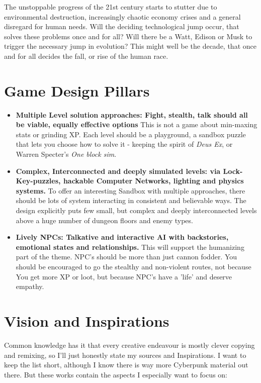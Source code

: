 \documentclass[11pt,a4paper, twocolumn]{article}
\begin{document}
The unstoppable progress of the 21st century starts to stutter due to environmental
destruction, increasingly chaotic economy crises and a general disregard for human
needs. Will the deciding technological jump occur, that solves these problems once and
for all? Will there be a Watt, Edison or Musk to trigger the necessary jump in evolution?
This might well be the decade, that once and for all decides the fall, or rise of the
human race.

\section{Game Design Pillars}
\begin{itemize}
    \item \textbf{Multiple Level solution approaches:
        Fight, stealth, talk should all be viable, equally effective options}
        This is not a game about min-maxing stats or grinding XP. Each level should be a
        playground, a sandbox puzzle that lets you choose how to solve it - keeping the spirit
        of \textit{Deus Ex}, or Warren Specter's \textit{One block sim}.

    \item \textbf{Complex, Interconnected and deeply simulated levels:
        via Lock-Key-puzzles, hackable Computer Networks, lighting and physics systems.}
        To offer an interesting Sandbox with multiple approaches, there should be lots of system
        interacting in consistent and believable ways. The design explicitly puts few small, but
        complex and deeply interconnected levels above a huge number of dungeon floors and enemy
        types.

    \item \textbf{Lively NPCs:
        Talkative and interactive AI with backstories, emotional states and relationships.}
        This will support the humanizing part of the theme. NPC's should be more than just cannon
        fodder. You should be encouraged to go the stealthy and non-violent routes, not because You
        get more XP or loot, but because NPC's have a 'life' and deserve empathy.
\end{itemize}

\section{Vision and Inspirations}
Common knowledge has it that every creative endeavour is mostly clever copying and remixing, so I'll
just honestly state my sources and Inspirations. I want to keep the list short, although I know there
is way more Cyberpunk material out there. But these works contain the aspects I especially want to
focus on:\\ \
\end{document}
